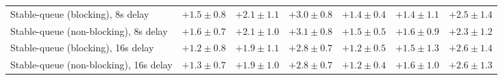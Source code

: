 \begin{table}[H]
{\begin{tabular}{l w{c}{5.0em} w{c}{5.0em} w{c}{5.0em} w{c}{5.0em} w{c}{5.0em} w{c}{5.0em}}
Stable-queue (blocking), 8s delay & $+1.5\pm0.8$ & $+2.1\pm1.1$ & $+3.0\pm0.8$ & $+1.4\pm0.4$ & $+1.4\pm1.1$ & $+2.5\pm1.4$ \\
Stable-queue (non-blocking), 8s delay & $+1.6\pm0.7$ & $+2.1\pm1.0$ & $+3.1\pm0.8$ & $+1.5\pm0.5$ & $+1.6\pm0.9$ & $+2.3\pm1.2$ \\
Stable-queue (blocking), 16s delay & $+1.2\pm0.8$ & $+1.9\pm1.1$ & $+2.8\pm0.7$ & $+1.2\pm0.5$ & $+1.5\pm1.3$ & $+2.6\pm1.4$ \\
Stable-queue (non-blocking), 16s delay & $+1.3\pm0.7$ & $+1.9\pm1.0$ & $+2.8\pm0.7$ & $+1.2\pm0.4$ & $+1.6\pm1.0$ & $+2.6\pm1.3$ \\
\bottomrule
\end{tabular}%
}
\end{table}
